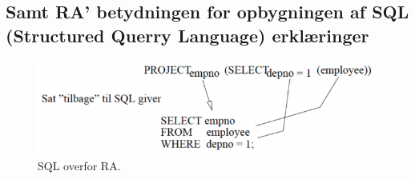 






\subsection{Samt RA' betydningen for opbygningen af  SQL (Structured Querry Language) erklæringer}

\begin{figure}[H]
\centering
\includegraphics[width=0.8\linewidth]{figs/spm6/sql_ra}
\caption{SQL overfor RA.}
\label{fig:sql_ra}
\end{figure}






















